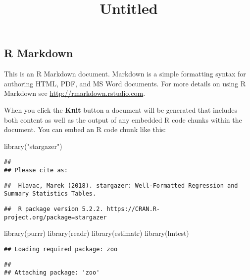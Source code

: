 \documentclass[
]{article}
\title{Untitled}
\author{}
\date{\vspace{-2.5em}}
\newenvironment{Shaded}{\begin{snugshade}}{\end{snugshade}}
\newcommand{\FunctionTok}[1]{\textcolor[rgb]{0.00,0.00,0.00}{#1}}
\newcommand{\NormalTok}[1]{#1}
\newcommand{\StringTok}[1]{\textcolor[rgb]{0.31,0.60,0.02}{#1}}
\begin{document}
\maketitle

\hypertarget{r-markdown}{%
\subsection{R Markdown}\label{r-markdown}}

This is an R Markdown document. Markdown is a simple formatting syntax
for authoring HTML, PDF, and MS Word documents. For more details on
using R Markdown see \url{http://rmarkdown.rstudio.com}.

When you click the \textbf{Knit} button a document will be generated
that includes both content as well as the output of any embedded R code
chunks within the document. You can embed an R code chunk like this:

\begin{Shaded}
\begin{Highlighting}[]
\FunctionTok{library}\NormalTok{(}\StringTok{"stargazer"}\NormalTok{)}
\end{Highlighting}
\end{Shaded}

\begin{verbatim}
## 
## Please cite as:
\end{verbatim}

\begin{verbatim}
##  Hlavac, Marek (2018). stargazer: Well-Formatted Regression and Summary Statistics Tables.
\end{verbatim}

\begin{verbatim}
##  R package version 5.2.2. https://CRAN.R-project.org/package=stargazer
\end{verbatim}

\begin{Shaded}
\begin{Highlighting}[]
\FunctionTok{library}\NormalTok{(purrr)}
\FunctionTok{library}\NormalTok{(readr)}
\FunctionTok{library}\NormalTok{(estimatr)}
\FunctionTok{library}\NormalTok{(lmtest)}
\end{Highlighting}
\end{Shaded}

\begin{verbatim}
## Loading required package: zoo
\end{verbatim}

\begin{verbatim}
## 
## Attaching package: 'zoo'
\end{verbatim}
\end{document}
